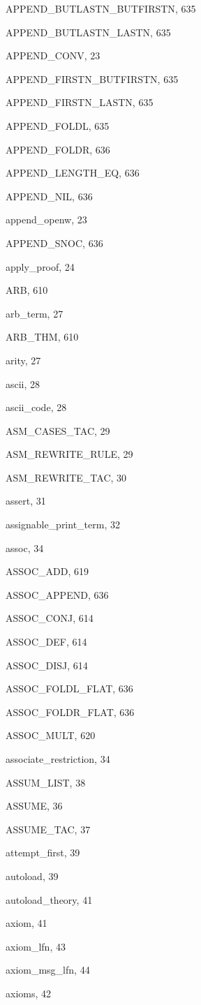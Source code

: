 \begin{theindex}
  \item {\ptt APPEND\_BUTLASTN\_BUTFIRSTN}, 635
  \item {\ptt APPEND\_BUTLASTN\_LASTN}, 635
  \item {\ptt APPEND\_CONV}, 23
  \item {\ptt APPEND\_FIRSTN\_BUTFIRSTN}, 635
  \item {\ptt APPEND\_FIRSTN\_LASTN}, 635
  \item {\ptt APPEND\_FOLDL}, 635
  \item {\ptt APPEND\_FOLDR}, 636
  \item {\ptt APPEND\_LENGTH\_EQ}, 636
  \item {\ptt APPEND\_NIL}, 636
  \item {\ptt append\_openw}, 23
  \item {\ptt APPEND\_SNOC}, 636
  \item {\ptt apply\_proof}, 24
  \item {\ptt ARB}, 610
  \item {\ptt arb\_term}, 27
  \item {\ptt ARB\_THM}, 610
  \item {\ptt arity}, 27
  \item {\ptt ascii}, 28
  \item {\ptt ascii\_code}, 28
  \item {\ptt ASM\_CASES\_TAC}, 29
  \item {\ptt ASM\_REWRITE\_RULE}, 29
  \item {\ptt ASM\_REWRITE\_TAC}, 30
  \item {\ptt assert}, 31
  \item {\ptt assignable\_print\_term}, 32
  \item {\ptt assoc}, 34
  \item {\ptt ASSOC\_ADD}, 619
  \item {\ptt ASSOC\_APPEND}, 636
  \item {\ptt ASSOC\_CONJ}, 614
  \item {\ptt ASSOC\_DEF}, 614
  \item {\ptt ASSOC\_DISJ}, 614
  \item {\ptt ASSOC\_FOLDL\_FLAT}, 636
  \item {\ptt ASSOC\_FOLDR\_FLAT}, 636
  \item {\ptt ASSOC\_MULT}, 620
  \item {\ptt associate\_restriction}, 34
  \item {\ptt ASSUM\_LIST}, 38
  \item {\ptt ASSUME}, 36
  \item {\ptt ASSUME\_TAC}, 37
  \item {\ptt attempt\_first}, 39
  \item {\ptt autoload}, 39
  \item {\ptt autoload\_theory}, 41
  \item {\ptt axiom}, 41
  \item {\ptt axiom\_lfn}, 43
  \item {\ptt axiom\_msg\_lfn}, 44
  \item {\ptt axioms}, 42


\end{theindex}
